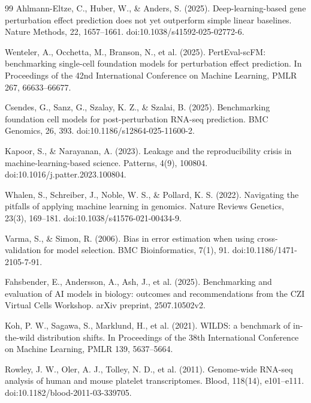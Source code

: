 \documentclass[11pt,a4paper]{article}
\begin{document}
\begin{thebibliography}{99}
Ahlmann-Eltze, C., Huber, W., \& Anders, S. (2025).
\newblock Deep-learning-based gene perturbation effect prediction does not yet outperform simple linear baselines.
\newblock Nature Methods, 22, 1657--1661. doi:10.1038/s41592-025-02772-6.

Wenteler, A., Occhetta, M., Branson, N., et al. (2025).
\newblock PertEval-scFM: benchmarking single-cell foundation models for perturbation effect prediction.
\newblock In Proceedings of the 42nd International Conference on Machine Learning, PMLR 267, 66633--66677.

Csendes, G., Sanz, G., Szalay, K. Z., \& Szalai, B. (2025).
\newblock Benchmarking foundation cell models for post-perturbation RNA-seq prediction.
\newblock BMC Genomics, 26, 393. doi:10.1186/s12864-025-11600-2.

Kapoor, S., \& Narayanan, A. (2023).
\newblock Leakage and the reproducibility crisis in machine-learning-based science.
\newblock Patterns, 4(9), 100804. doi:10.1016/j.patter.2023.100804.

Whalen, S., Schreiber, J., Noble, W. S., \& Pollard, K. S. (2022).
\newblock Navigating the pitfalls of applying machine learning in genomics.
\newblock Nature Reviews Genetics, 23(3), 169--181. doi:10.1038/s41576-021-00434-9.

Varma, S., \& Simon, R. (2006).
\newblock Bias in error estimation when using cross-validation for model selection.
\newblock BMC Bioinformatics, 7(1), 91. doi:10.1186/1471-2105-7-91.

Fahsbender, E., Andersson, A., Ash, J., et al. (2025).
\newblock Benchmarking and evaluation of AI models in biology: outcomes and recommendations from the CZI Virtual Cells Workshop.
\newblock arXiv preprint, 2507.10502v2.

Koh, P. W., Sagawa, S., Marklund, H., et al. (2021).
\newblock WILDS: a benchmark of in-the-wild distribution shifts.
\newblock In Proceedings of the 38th International Conference on Machine Learning, PMLR 139, 5637--5664.

Rowley, J. W., Oler, A. J., Tolley, N. D., et al. (2011).
\newblock Genome-wide RNA-seq analysis of human and mouse platelet transcriptomes.
\newblock Blood, 118(14), e101--e111. doi:10.1182/blood-2011-03-339705.


\end{thebibliography}
\end{document}
